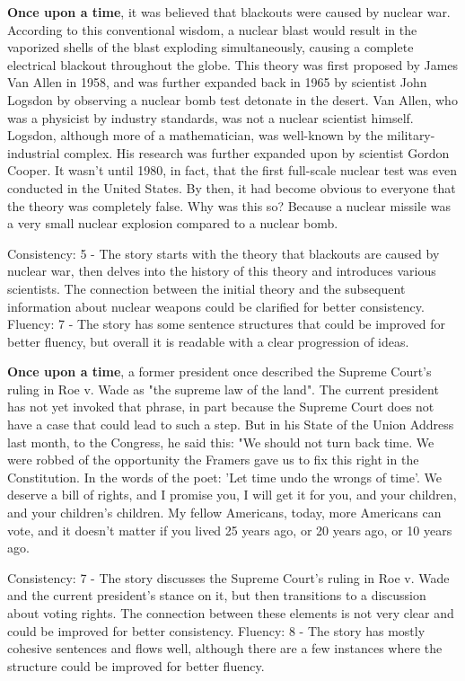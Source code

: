 \documentclass{article}
\begin{document}
\textbf{Once upon a time}, it was believed that blackouts were caused by nuclear war. According to this conventional wisdom, a nuclear blast would result in the vaporized shells of the blast exploding simultaneously, causing a complete electrical blackout throughout the globe. This theory was first proposed by James Van Allen in 1958, and was further expanded back in 1965 by scientist John Logsdon by observing a nuclear bomb test detonate in the desert. Van Allen, who was a physicist by industry standards, was not a nuclear scientist himself. Logsdon, although more of a mathematician, was well-known by the military-industrial complex. His research was further expanded upon by scientist Gordon Cooper. It wasn't until 1980, in fact, that the first full-scale nuclear test was even conducted in the United States. By then, it had become obvious to everyone that the theory was completely false. Why was this so? Because a nuclear missile was a very small nuclear explosion compared to a nuclear bomb.

Consistency: 5 - The story starts with the theory that blackouts are caused by nuclear war, then delves into the history of this theory and introduces various scientists. The connection between the initial theory and the subsequent information about nuclear weapons could be clarified for better consistency.
Fluency: 7 - The story has some sentence structures that could be improved for better fluency, but overall it is readable with a clear progression of ideas.

\textbf{Once upon a time}, a former president once described the Supreme Court's ruling in Roe v. Wade as "the supreme law of the land". The current president has not yet invoked that phrase, in part because the Supreme Court does not have a case that could lead to such a step. But in his State of the Union Address last month, to the Congress, he said this: "We should not turn back time. We were robbed of the opportunity the Framers gave us to fix this right in the Constitution. In the words of the poet: 'Let time undo the wrongs of time'. We deserve a bill of rights, and I promise you, I will get it for you, and your children, and your children's children. My fellow Americans, today, more Americans can vote, and it doesn't matter if you lived 25 years ago, or 20 years ago, or 10 years ago.

Consistency: 7 - The story discusses the Supreme Court's ruling in Roe v. Wade and the current president's stance on it, but then transitions to a discussion about voting rights. The connection between these elements is not very clear and could be improved for better consistency.
Fluency: 8 - The story has mostly cohesive sentences and flows well, although there are a few instances where the structure could be improved for better fluency.
\end{document}
